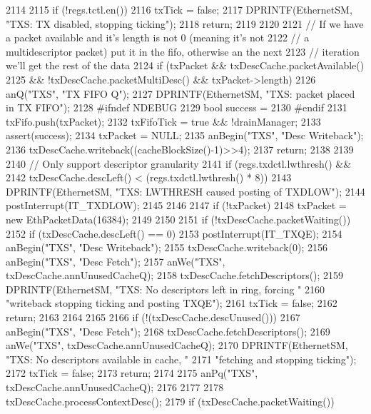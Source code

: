 \begin{DoxyCode}
2114 {
2115     if (!regs.tctl.en()) {
2116         txTick = false;
2117         DPRINTF(EthernetSM, "TXS: TX disabled, stopping ticking\n");
2118         return;
2119     }
2120 
2121     // If we have a packet available and it's length is not 0 (meaning it's not
2122     // a multidescriptor packet) put it in the fifo, otherwise an the next
2123     // iteration we'll get the rest of the data
2124     if (txPacket && txDescCache.packetAvailable()
2125         && !txDescCache.packetMultiDesc() && txPacket->length) {
2126         anQ("TXS", "TX FIFO Q");
2127         DPRINTF(EthernetSM, "TXS: packet placed in TX FIFO\n");
2128 #ifndef NDEBUG
2129         bool success =
2130 #endif
2131             txFifo.push(txPacket);
2132         txFifoTick = true && !drainManager;
2133         assert(success);
2134         txPacket = NULL;
2135         anBegin("TXS", "Desc Writeback");
2136         txDescCache.writeback((cacheBlockSize()-1)>>4);
2137         return;
2138     }
2139 
2140     // Only support descriptor granularity
2141     if (regs.txdctl.lwthresh() &&
2142         txDescCache.descLeft() < (regs.txdctl.lwthresh() * 8)) {
2143         DPRINTF(EthernetSM, "TXS: LWTHRESH caused posting of TXDLOW\n");
2144         postInterrupt(IT_TXDLOW);
2145     }
2146 
2147     if (!txPacket) {
2148         txPacket = new EthPacketData(16384);
2149     }
2150 
2151     if (!txDescCache.packetWaiting()) {
2152         if (txDescCache.descLeft() == 0) {
2153             postInterrupt(IT_TXQE);
2154             anBegin("TXS", "Desc Writeback");
2155             txDescCache.writeback(0);
2156             anBegin("TXS", "Desc Fetch");
2157             anWe("TXS", txDescCache.annUnusedCacheQ);
2158             txDescCache.fetchDescriptors();
2159             DPRINTF(EthernetSM, "TXS: No descriptors left in ring, forcing "
2160                     "writeback stopping ticking and posting TXQE\n");
2161             txTick = false;
2162             return;
2163         }
2164 
2165 
2166         if (!(txDescCache.descUnused())) {
2167             anBegin("TXS", "Desc Fetch");
2168             txDescCache.fetchDescriptors();
2169             anWe("TXS", txDescCache.annUnusedCacheQ);
2170             DPRINTF(EthernetSM, "TXS: No descriptors available in cache, "
2171                     "fetching and stopping ticking\n");
2172             txTick = false;
2173             return;
2174         }
2175         anPq("TXS", txDescCache.annUnusedCacheQ);
2176 
2177 
2178         txDescCache.processContextDesc();
2179         if (txDescCache.packetWaiting()) {
}}}
\end{DoxyCode}
